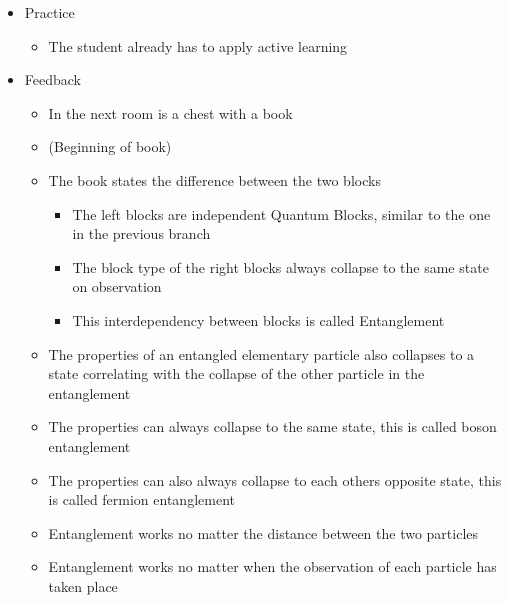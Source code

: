 \documentclass[11pt,twoside]{report} %
\begin{document}
\begin{itemize}
\begin{itemize}
		\end{itemize}
		\item Practice
		\begin{itemize}
			\item The student already has to apply active learning
		\end{itemize}
		\item Feedback
		\begin{itemize}
			\item In the next room is a chest with a book
			\item (Beginning of book)
			\item The book states the difference between the two blocks
			\begin{itemize}
				\item The left blocks are independent Quantum Blocks, similar to the one in the previous branch
				\item The block type of the right blocks always collapse to the same state on observation
				\item This interdependency between blocks is called Entanglement
			\end{itemize}
			\item The properties of an entangled elementary particle also collapses to a state correlating with the collapse of the other particle in the entanglement
			\item The properties can always collapse to the same state, this is called boson entanglement
			\item The properties can also always collapse to each others opposite state, this is called fermion entanglement
			\item Entanglement works no matter the distance between the two particles
			\item Entanglement works no matter when the observation of each particle has taken place
		\end{itemize}
	\end{itemize}
\end{document}
